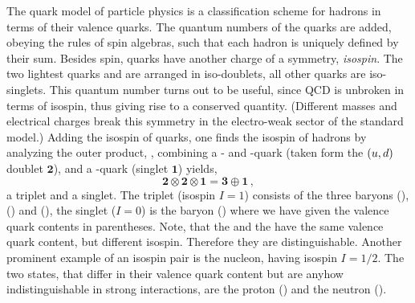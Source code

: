 The quark model of particle physics is a classification scheme for hadrons in terms of their valence quarks.
The quantum numbers of the quarks are added, obeying the rules of spin algebras, such that each hadron is uniquely defined by their sum.
Besides spin, quarks have another charge of a \grpsutw symmetry, \textit{isospin}.
The two lightest quarks \uquark and \dquark are arranged in iso-doublets, all other quarks are iso-singlets.
This quantum number turns out to be useful, since QCD is unbroken in terms of isospin, thus giving rise to a conserved quantity. 
(Different masses and electrical charges break this symmetry in the electro-weak sector of the standard model.)
Adding the isospin of quarks, one finds the isospin of hadrons by analyzing the outer product, \eg{}, combining a \uquark- and \dquark-quark (taken form the $({u},{d})$ doublet $\bm{2}$), and a \squark-quark (singlet $\bm{1}$) yields,
\begin{equation*}
    \bm{2} \otimes \bm{2} \otimes \bm{1} = \bm{3} \oplus \bm{1} \,,
\end{equation*}
a triplet and a singlet.
The triplet (isospin $I=1$) consists of the three baryons \Sp (\uquark\uquark\squark), \Sz (\uquark\dquark\squark) and \Sm (\dquark\dquark\squark), the singlet ($I=0$) is the \Lz baryon (\uquark\dquark\squark) where we have given the valence quark contents in parentheses.
Note, that the \Sz and the \Lz have the same valence quark content, but different isospin.
Therefore they are distinguishable.
Another prominent example of an isospin pair is the nucleon, having isospin $I = 1/2$.
The two states, that differ in their valence quark content but are anyhow indistinguishable in strong interactions, are the proton (\uquark\uquark\dquark) and the neutron (\uquark\dquark\dquark).

